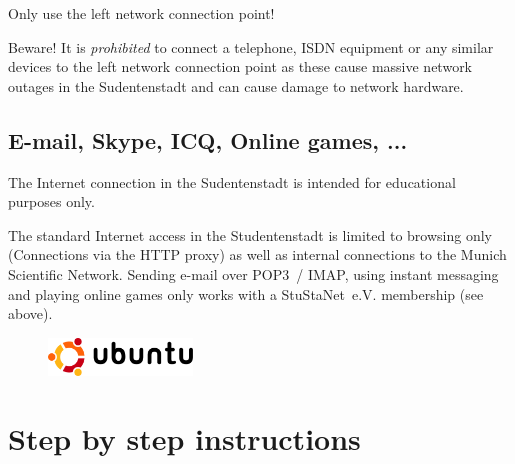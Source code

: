 \documentclass[a4paper,12pt]{scrartcl}
\begin{document}
Only use the left network connection point!

Beware! It is \emph{prohibited} to connect a telephone, ISDN equipment or any similar devices to the left network connection point as these cause massive network outages in the Sudentenstadt and can cause damage to network hardware.

\subsection*{E-mail, Skype, ICQ, Online games, ...}

The Internet connection in the Sudentenstadt is intended for educational purposes only.

The standard Internet access in the Studentenstadt is limited to browsing only (Connections via the HTTP proxy) as well as internal connections to the Munich Scientific Network. Sending e-mail over POP3~/ IMAP, using instant messaging and playing online games only works with a StuStaNet~e.V. membership (see above).


\newpage

\begin{figure}[t!]
    \raggedleft
    \vspace{-20pt}
    \includegraphics[height=1cm,keepaspectratio]{Bilder/Ubuntu_logo}
    \vspace{-20pt}
\end{figure}

\section*{Step by step instructions}
\end{document}
